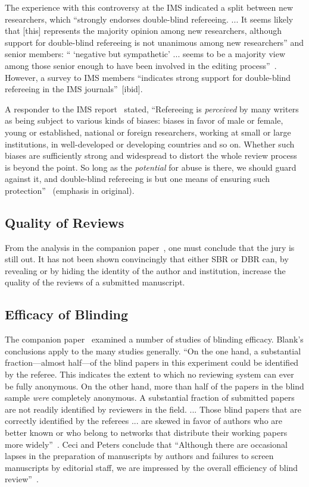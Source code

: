 \documentclass[acmtods,acmnow]{acmtrans2m}
\begin{document}
The experience with this controversy at the IMS indicated a split between
new researchers, which ``strongly endorses double-blind refereeing. ... It
seems likely that [this] represents the majority opinion among new
researchers, although support for double-blind refereeing is not unanimous
among new researchers'' and senior members: `` `negative but sympathetic'
... seems to be a majority view among those senior enough to have been
involved in the editing process''~\cite[page~311]{cox93}. However, a survey
to IMS members ``indicates strong support for double-blind refereeing in the
IMS journals''~[ibid].

A responder to the IMS report~\cite{cox93} stated, ``Refereeing is
{\em perceived} by many writers as being subject to various kinds of biases:
biases in favor of male or female, young or established, national or foreign
researchers, working at small or large institutions, in well-developed or
developing countries and so on. Whether such biases are sufficiently strong
and widespread to distort the whole review process is beyond the point. So
long as the {\em potential\/} for abuse is there, we should guard against it,
and double-blind refereeing is but one means of ensuring such
protection''~\cite[page 324]{genest93} (emphasis in original).

\subsection{Quality of Reviews}

From the analysis in the companion paper~\cite{DBR}, one must conclude that
the jury is still out. It has not been shown convincingly that either SBR or
DBR can, by revealing or by hiding the identity of the author and
institution, increase the quality of the reviews of a submitted manuscript.

\subsection{Efficacy of Blinding}\label{sec:efficacy}

The companion paper~\cite{DBR} examined a number of studies of blinding
efficacy. Blank's conclusions apply to the many studies generally. ``On
the one hand, a substantial fraction---almost half---of the blind papers in
this experiment could be identified by the referee. This indicates the
extent to which no reviewing system can ever be fully anonymous. On the
other hand, more than half of the papers in the blind sample {\em were}
completely anonymous. A substantial fraction of submitted papers are not
readily identified by reviewers in the field. ... Those blind papers that
are correctly identified by the referees ... are skewed in favor of authors
who are better known or who belong to networks that distribute their working
papers more widely''~\cite[pp.~1051--2]{blank91}. Ceci and Peters
conclude that ``Although there are occasional lapses in the preparation of
manuscripts by authors and failures to screen manuscripts by editorial
staff, we are impressed by the overall efficiency of blind
review''~\cite[page 1494]{ceci84}.
\end{document}
